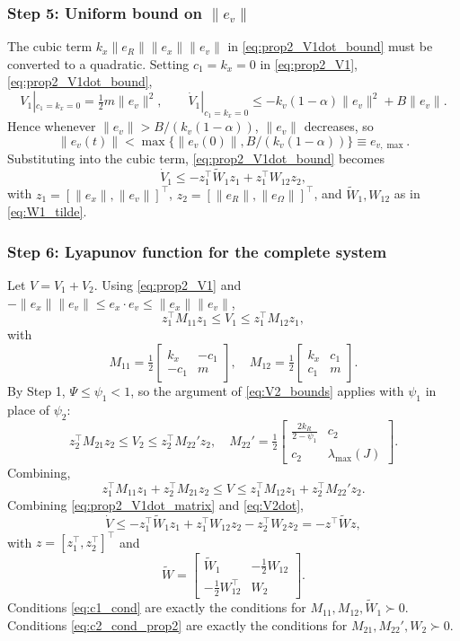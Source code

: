 \documentclass[11pt]{article}
\theoremstyle{remark}
\newcommand{\lmax}{\lambda_{\max}}
\begin{document}
\subsubsection*{Step 5: Uniform bound on $\|e_v\|$}
The cubic term $k_x\|e_R\|\|e_x\|\|e_v\|$ in \eqref{eq:prop2_V1dot_bound} must be converted to a quadratic. Setting $c_1 = k_x = 0$ in \eqref{eq:prop2_V1}, \eqref{eq:prop2_V1dot_bound},
\[
V_1|_{c_1=k_x=0} = \tfrac{1}{2}m\|e_v\|^2,\qquad \dot V_1|_{c_1=k_x=0} \le -k_v(1-\alpha)\|e_v\|^2 + B\|e_v\|.
\]
Hence whenever $\|e_v\| > B/(k_v(1-\alpha))$, $\|e_v\|$ decreases, so
\begin{equation}
\|e_v(t)\| < \max\{\|e_v(0)\|, B/(k_v(1-\alpha))\} \equiv e_{v,\max}.
\label{eq:prop2_evmax}
\end{equation}
Substituting into the cubic term, \eqref{eq:prop2_V1dot_bound} becomes
\begin{equation}
\dot V_1 \le -z_1^\top \widetilde W_1 z_1 + z_1^\top W_{12} z_2,
\label{eq:prop2_V1dot_matrix}
\end{equation}
with $z_1 = [\|e_x\|,\|e_v\|]^\top$, $z_2 = [\|e_R\|,\|e_\Omega\|]^\top$, and $\widetilde W_1, W_{12}$ as in \eqref{eq:W1_tilde}.

\subsubsection*{Step 6: Lyapunov function for the complete system}
Let $V = V_1 + V_2$. Using \eqref{eq:prop2_V1} and $-\|e_x\|\|e_v\| \le e_x\cdot e_v \le \|e_x\|\|e_v\|$,
\[
z_1^\top M_{11} z_1 \le V_1 \le z_1^\top M_{12} z_1,
\]
with
\[
M_{11} = \tfrac{1}{2}\begin{bmatrix}k_x & -c_1\\-c_1 & m\end{bmatrix},\quad M_{12} = \tfrac{1}{2}\begin{bmatrix}k_x & c_1\\c_1 & m\end{bmatrix}.
\]
By Step 1, $\Psi \le \psi_1 < 1$, so the argument of \eqref{eq:V2_bounds} applies with $\psi_1$ in place of $\psi_2$:
\[
z_2^\top M_{21} z_2 \le V_2 \le z_2^\top M_{22}' z_2,\quad M_{22}' = \tfrac{1}{2}\begin{bmatrix}\tfrac{2k_R}{2-\psi_1} & c_2\\ c_2 & \lmax(J)\end{bmatrix}.
\]
Combining,
\begin{equation}
z_1^\top M_{11} z_1 + z_2^\top M_{21} z_2 \le V \le z_1^\top M_{12} z_1 + z_2^\top M_{22}' z_2.
\label{eq:prop2_V_bounds}
\end{equation}
Combining \eqref{eq:prop2_V1dot_matrix} and \eqref{eq:V2dot},
\[
\dot V \le -z_1^\top\widetilde W_1 z_1 + z_1^\top W_{12} z_2 - z_2^\top W_2 z_2 = -z^\top\widetilde W z,
\]
with $z = [z_1^\top, z_2^\top]^\top$ and
\[
\widetilde W = \begin{bmatrix}\widetilde W_1 & -\tfrac{1}{2}W_{12}\\[3pt] -\tfrac{1}{2}W_{12}^\top & W_2\end{bmatrix}.
\]
Conditions \eqref{eq:c1_cond} are exactly the conditions for $M_{11}, M_{12}, \widetilde W_1 \succ 0$. Conditions \eqref{eq:c2_cond_prop2} are exactly the conditions for $M_{21}, M_{22}', W_2 \succ 0$.
\end{document}
